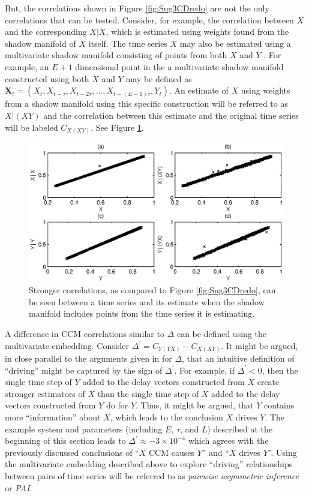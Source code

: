 \documentclass[twocolumn,aps,pre,groupedaddress]{revtex4-1}
\begin{document}
But, the correlations shown in Figure \ref{fig:Sug3CDredo} are not the only correlations that can be tested.  Consider, for example, the correlation between $X$ and the corresponding $X|X$, which is estimated using weights found from the shadow manifold of $X$ itself.  The time series $X$ may also be estimated using a multivariate shadow manifold consisting of points from both $X$ and $Y$ \cite{????}.  For example, an $E+1$ dimensional point in the a multivariate shadow manifold constructed using both $X$ and $Y$ may be defined as $\tilde{\mathbf{X}}_t=(X_t,X_{t-\tau},X_{t-2\tau},\ldots,X_{t-(E-1)\tau},Y_t)$.  An estimate of $X$ using weights from a shadow manifold using this specific construction will be referred to as $X|(XY)$ and the correlation between this estimate and the original time series will be labeled $C_{X(XY)}$.  See Figure \ref{fig:PAIintro}.
\begin{figure}[ht]
\includegraphics[scale=0.55]{SugFig3CD_AddPlot.eps}
\caption{Stronger correlations, as compared to Figure \ref{fig:Sug3CDredo}, can be seen between a time series and its estimate when the shadow manifold includes points from the time series it is estimating.}
\label{fig:PAIintro}
\end{figure}

A difference in CCM correlations similar to $\Delta$ can be defined using the multivariate embedding.  Consider $\Delta^\prime = C_{Y(YX)} - C_{X(XY)}$.  It might be argued, in close parallel to the arguments given in \cite{Sugihara2012} for $\Delta$, that an intuitive definition of ``driving'' might be captured by the sign of $\Delta^\prime$.  For example, if $\Delta^\prime<0$, then the single time step of $Y$ added to the delay vectors constructed from $X$ create stronger estimators of $X$ than the single time step of $X$ added to the delay vectors constructed from $Y$ do for $Y$.  Thus, it might be argued, that $Y$ contains more ``information'' about $X$, which leads to the conclusion $X$ drives $Y$.  The example system and parameters (including $E$, $\tau$, and $L$) described at the beginning of this section leads to $\Delta^\prime \approx -3\times 10^{-4}$ which agrees with the previously discussed conclusions of ``$X$ CCM causes $Y$'' and ``$X$ drives $Y$''.  Using the multivariate embedding described above to explore ``driving'' relationships between pairs of time series will be referred to as {\em pairwise asymmetric inference} or {\em PAI}.  
\end{document}
